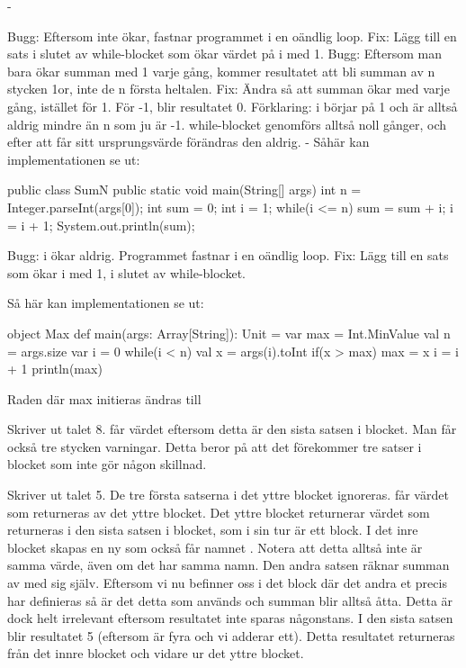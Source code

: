 \Subtask -

\Task 
\Subtask Bugg: Eftersom  inte ökar, fastnar programmet i en oändlig loop. Fix: Lägg till en sats i slutet av while-blocket som ökar värdet på i med 1.
Bugg: Eftersom man bara ökar summan med 1 varje gång, kommer resultatet att bli summan av n stycken 1or, inte de n första heltalen. Fix: Ändra så att summan ökar med  varje gång, istället för 1.
För -1, blir resultatet 0. Förklaring: i börjar på 1 och är alltså aldrig mindre än n som ju är -1. while-blocket genomförs alltså noll gånger, och efter att  får sitt ursprungsvärde förändras den aldrig.
\Subtask -
\Subtask Såhär kan implementationen se ut:
\begin{Code}
public class SumN {
  public static void main(String[] args) {
    int n = Integer.parseInt(args[0]);
    int sum = 0;
    int i = 1;
    while(i <= n){
      sum = sum + i;
      i = i + 1;
      }
    }
    System.out.println(sum);
}
\end{Code}

\Task 
\Subtask Bugg: i ökar aldrig. Programmet fastnar i en oändlig loop. Fix: Lägg till en sats som ökar i med 1, i slutet av while-blocket.

\Subtask Så här kan implementationen se ut:
\begin{Code}
object Max {
  def main(args: Array[String]): Unit = {
    var max = Int.MinValue
    val n = args.size
    var i = 0
    while(i < n) {
      val x = args(i).toInt
      if(x > max) {
        max = x
      }
      i = i + 1
    }
    println(max)
  }
}
\end{Code}
\Subtask Raden där max initieras ändras till  

\Subtask {}

\Subtask Skriver ut talet 8.  får värdet  eftersom detta är den sista satsen i blocket. Man får också tre stycken varningar. Detta beror på att det förekommer tre satser i blocket som inte gör någon skillnad.

\Subtask Skriver ut talet 5. De tre första satserna i det yttre blocket ignoreras.  får värdet som returneras av det yttre blocket. Det yttre blocket returnerar värdet som returneras i den sista satsen i blocket, som i sin tur är ett block. I det inre blocket skapas en ny  som också får namnet . Notera att detta alltså inte är samma värde, även om det har samma namn. Den andra satsen räknar summan av  med sig själv. Eftersom vi nu befinner oss i det block där det andra et precis har definieras så är det detta  som används och summan blir alltså åtta. Detta är dock helt irrelevant eftersom resultatet inte sparas någonstans. I den sista satsen blir resultatet 5 (eftersom  är fyra och vi adderar ett). Detta resultatet returneras från det innre blocket och vidare ur det yttre blocket.

